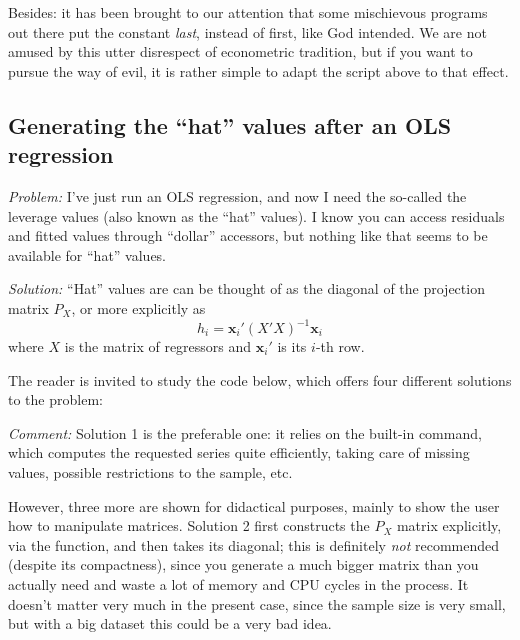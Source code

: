 Besides: it has been brought to our attention that some mischievous
programs out there put the constant \emph{last}, instead of first,
like God intended. We are not amused by this utter disrespect of
econometric tradition, but if you want to pursue the way of evil, it
is rather simple to adapt the script above to that effect.


\subsection{Generating the ``hat'' values after an OLS regression}
\label{sec:hatvalues}

\emph{Problem:} I've just run an OLS regression, and now I need the
so-called the leverage values (also known as the ``hat'' values). I
know you can access residuals and fitted values through ``dollar''
accessors, but nothing like that seems to be available for ``hat''
values.

\emph{Solution:}
``Hat'' values are can be thought of as the diagonal of the projection
matrix $P_X$, or more explicitly as
\[
h_i = \mathbf{x}_i' (X'X)^{-1} \mathbf{x}_i
\]
where $X$ is the matrix of regressors and $\mathbf{x}_i'$ is its
$i$-th row.

The reader is invited to study the code below, which offers four
different solutions to the problem:


\emph{Comment:} Solution 1 is the preferable one: it relies on the
built-in  command, which computes the requested series
quite efficiently, taking care of missing values, possible
restrictions to the sample, etc.

However, three more are shown for didactical purposes, mainly to show
the user how to manipulate matrices. Solution 2 first constructs the
$P_X$ matrix explicitly, via the  function, and then takes
its diagonal; this is definitely \emph{not} recommended (despite its
compactness), since you generate a much bigger matrix than you
actually need and waste a lot of memory and CPU cycles in the
process. It doesn't matter very much in the present case, since the
sample size is very small, but with a big dataset this could be a very
bad idea.


